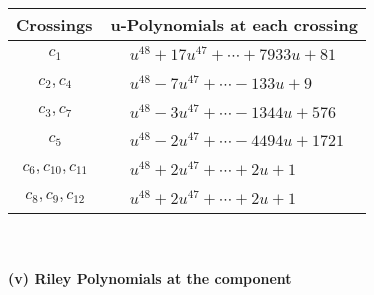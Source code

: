 \documentclass[1p]{elsarticle_modified}
\theoremstyle{definition}
\begin{document}
\begin{tabular}{m{50pt}|m{274pt}}
Crossings & \hspace{64pt}u-Polynomials at each crossing \\
\hline $$\begin{aligned}c_{1}\end{aligned}$$&$\begin{aligned}
&u^{48}+17 u^{47}+\cdots+7933 u+81
\end{aligned}$\\
\hline $$\begin{aligned}c_{2},c_{4}\end{aligned}$$&$\begin{aligned}
&u^{48}-7 u^{47}+\cdots-133 u+9
\end{aligned}$\\
\hline $$\begin{aligned}c_{3},c_{7}\end{aligned}$$&$\begin{aligned}
&u^{48}-3 u^{47}+\cdots-1344 u+576
\end{aligned}$\\
\hline $$\begin{aligned}c_{5}\end{aligned}$$&$\begin{aligned}
&u^{48}-2 u^{47}+\cdots-4494 u+1721
\end{aligned}$\\
\hline $$\begin{aligned}c_{6},c_{10},c_{11}\end{aligned}$$&$\begin{aligned}
&u^{48}+2 u^{47}+\cdots+2 u+1
\end{aligned}$\\
\hline $$\begin{aligned}c_{8},c_{9},c_{12}\end{aligned}$$&$\begin{aligned}
&u^{48}+2 u^{47}+\cdots+2 u+1
\end{aligned}$\\
\hline
\end{tabular}\\~\\
\newpage\renewcommand{\arraystretch}{1}
\flushleft \textbf{(v) Riley Polynomials at the component}\newline \\
\end{document}
